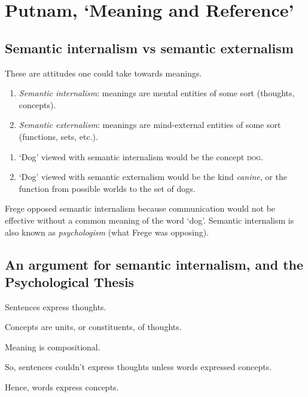 \chapter{Putnam, `Meaning and Reference'}

\section{Semantic internalism vs semantic externalism}

These are attitudes one could take towards meanings.

\begin{definition}\leavevmode
\begin{enumerate}[label=(\alph*)]
  \item \emph{Semantic internalism}: meanings are mental entities of some sort (thoughts, concepts).
  \item \emph{Semantic externalism}: meanings are mind-external entities of some sort (functions, sets, etc.).
\end{enumerate}
\end{definition}

\begin{example}\leavevmode
\begin{enumerate}[label=\roman*.]
  \item `Dog' viewed with semantic internalism would be the concept \textsc{dog}.
  \item `Dog' viewed with semantic externalism would be the kind \emph{canine}, or the function from possible worlds to the set of dogs.
\end{enumerate}
\end{example}

Frege opposed semantic internalism because communication would not be effective without a common meaning of the word `dog'. Semantic internalism is also known as \emph{psychologism} (what Frege was opposing).

\section{An argument for semantic internalism, and the Psychological Thesis}

\begin{argument}\leavevmode
\begin{premises}
  \item[P1)] Sentences express thoughts.
  \item[P2)] Concepts are units, or constituents, of thoughts.
  \item[P3)] Meaning is compositional.
  \item[C1)] So, sentences couldn't express thoughts unless words expressed concepts.
  \item[C2)] Hence, words express concepts.
\end{premises}
\end{argument}

